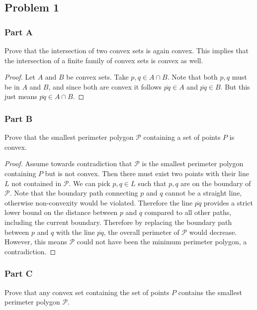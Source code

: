 \documentclass{eeleyes}
\begin{document}
\subsection*{Problem 1}

\begin{problem}
    \subsubsection*{Part A}
    Prove that the intersection of two convex sets is again convex. This implies that the intersection of a finite family of convex sets is convex as well.
\end{problem}

\begin{proof}
    Let $A$ and $B$ be convex sets. Take $p,q \in A \cap B$. Note that both $p,q$ must be in $A$ and $B$, and since both are convex it follows $\overline{pq} \in A$ and $\overline{pq} \in B$. But this just means $\overline{pq} \in A \cap B$.
\end{proof}

\begin{problem}
    \subsubsection*{Part B}
    Prove that the smallest perimeter polygon $\mathcal{P}$ containing a set of points $P$ is convex.
\end{problem}

\begin{proof}
    Assume towards contradiction that $\mathcal{P}$ is the smallest perimeter polygon containing $P$ but is not convex. Then there must exist two points with their line $L$ not contained in $\mathcal{P}$. We can pick $p,q \in L$ such that $p,q$ are on the boundary of $\mathcal{P}$. Note that the boundary path connecting $p$ and $q$ cannot be a straight line, otherwise non-convexity would be violated. Therefore the line $\overline{pq}$ provides a strict lower bound on the distance between $p$ and $q$ compared to all other paths, including the current boundary. Therefore by replacing the boundary path between $p$ and $q$ with the line $\overline{pq}$, the overall perimeter of $\mathcal{P}$ would decrease. However, this means $\mathcal{P}$ could not have been the minimum perimeter polygon, a contradiction.
\end{proof}

\begin{problem}
    \subsubsection*{Part C}
    Prove that any convex set containing the set of points $P$ contains the smallest perimeter polygon $\mathcal{P}$.
\end{problem}
\end{document}
